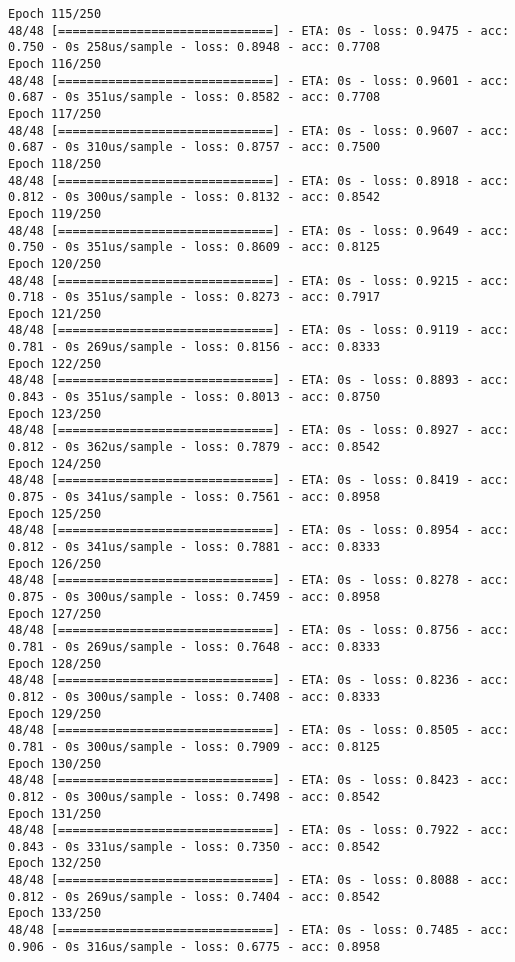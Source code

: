 \documentclass[11pt]{article}
\begin{document}
\begin{Verbatim}[commandchars=\\\{\}]
Epoch 115/250
48/48 [==============================] - ETA: 0s - loss: 0.9475 - acc: 0.750 - 0s 258us/sample - loss: 0.8948 - acc: 0.7708
Epoch 116/250
48/48 [==============================] - ETA: 0s - loss: 0.9601 - acc: 0.687 - 0s 351us/sample - loss: 0.8582 - acc: 0.7708
Epoch 117/250
48/48 [==============================] - ETA: 0s - loss: 0.9607 - acc: 0.687 - 0s 310us/sample - loss: 0.8757 - acc: 0.7500
Epoch 118/250
48/48 [==============================] - ETA: 0s - loss: 0.8918 - acc: 0.812 - 0s 300us/sample - loss: 0.8132 - acc: 0.8542
Epoch 119/250
48/48 [==============================] - ETA: 0s - loss: 0.9649 - acc: 0.750 - 0s 351us/sample - loss: 0.8609 - acc: 0.8125
Epoch 120/250
48/48 [==============================] - ETA: 0s - loss: 0.9215 - acc: 0.718 - 0s 351us/sample - loss: 0.8273 - acc: 0.7917
Epoch 121/250
48/48 [==============================] - ETA: 0s - loss: 0.9119 - acc: 0.781 - 0s 269us/sample - loss: 0.8156 - acc: 0.8333
Epoch 122/250
48/48 [==============================] - ETA: 0s - loss: 0.8893 - acc: 0.843 - 0s 351us/sample - loss: 0.8013 - acc: 0.8750
Epoch 123/250
48/48 [==============================] - ETA: 0s - loss: 0.8927 - acc: 0.812 - 0s 362us/sample - loss: 0.7879 - acc: 0.8542
Epoch 124/250
48/48 [==============================] - ETA: 0s - loss: 0.8419 - acc: 0.875 - 0s 341us/sample - loss: 0.7561 - acc: 0.8958
Epoch 125/250
48/48 [==============================] - ETA: 0s - loss: 0.8954 - acc: 0.812 - 0s 341us/sample - loss: 0.7881 - acc: 0.8333
Epoch 126/250
48/48 [==============================] - ETA: 0s - loss: 0.8278 - acc: 0.875 - 0s 300us/sample - loss: 0.7459 - acc: 0.8958
Epoch 127/250
48/48 [==============================] - ETA: 0s - loss: 0.8756 - acc: 0.781 - 0s 269us/sample - loss: 0.7648 - acc: 0.8333
Epoch 128/250
48/48 [==============================] - ETA: 0s - loss: 0.8236 - acc: 0.812 - 0s 300us/sample - loss: 0.7408 - acc: 0.8333
Epoch 129/250
48/48 [==============================] - ETA: 0s - loss: 0.8505 - acc: 0.781 - 0s 300us/sample - loss: 0.7909 - acc: 0.8125
Epoch 130/250
48/48 [==============================] - ETA: 0s - loss: 0.8423 - acc: 0.812 - 0s 300us/sample - loss: 0.7498 - acc: 0.8542
Epoch 131/250
48/48 [==============================] - ETA: 0s - loss: 0.7922 - acc: 0.843 - 0s 331us/sample - loss: 0.7350 - acc: 0.8542
Epoch 132/250
48/48 [==============================] - ETA: 0s - loss: 0.8088 - acc: 0.812 - 0s 269us/sample - loss: 0.7404 - acc: 0.8542
Epoch 133/250
48/48 [==============================] - ETA: 0s - loss: 0.7485 - acc: 0.906 - 0s 316us/sample - loss: 0.6775 - acc: 0.8958

\end{Verbatim}
\end{document}
